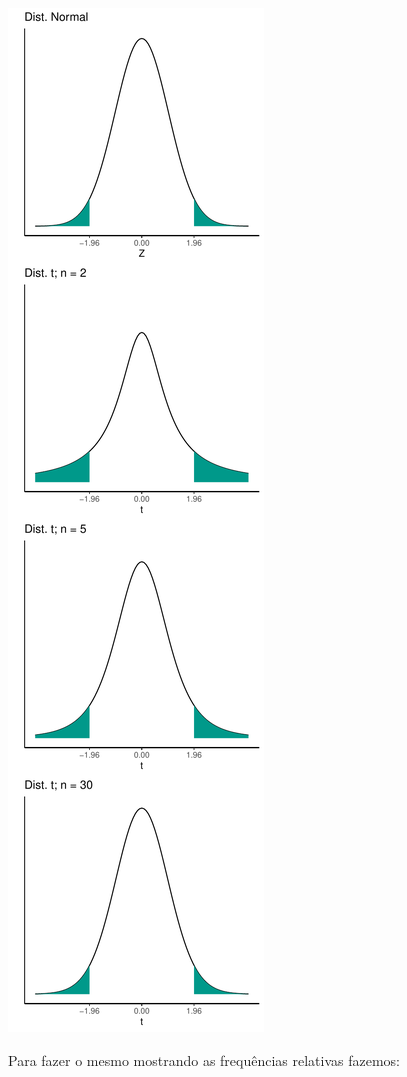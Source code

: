 \documentclass[
]{book}
\begin{document}
\includegraphics{probest-cambientais_files/figure-latex/unnamed-chunk-112-1.pdf}

Para fazer o mesmo mostrando as frequências relativas fazemos:
\end{document}
